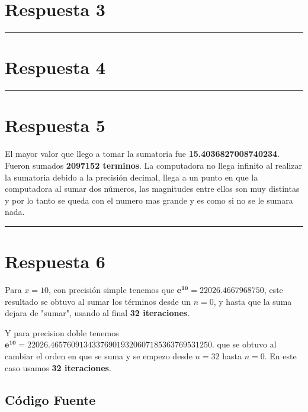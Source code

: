 \documentclass{article}
\begin{document}
\section*{Respuesta 3}



\hrule
\section*{Respuesta 4}



\hrule
\section*{Respuesta 5}
El mayor valor que llego a tomar la sumatoria fue \textbf{15.4036827008740234}.
Fueron sumados \textbf{2097152 terminos}. 
La computadora no llega infinito al realizar la sumatoria debido
a la precisión decimal, llega a un punto en que la computadora al sumar dos números, las magnitudes entre ellos
son muy distintas y por lo tanto se queda con el numero mas grande y es como si no se le sumara nada.


\hrule
\section*{Respuesta 6}
\begin{itemize}
	Para $x = 10$, con precisión simple tenemos que $\boldsymbol{e^{10} = 22026.4667968750}$,
	este resultado se obtuvo al sumar los términos desde un $n = 0$, y hasta que la suma dejara de "sumar",
	usando al final \textbf{32 iteraciones}.

	Y para precision doble tenemos $\boldsymbol{e^{10} = 22026.465760913433769019320607185363769531250}$.
	que se obtuvo al cambiar el orden en que se suma y se empezo desde $n = 32$ hasta $n = 0$. En este caso usamos \textbf{32 iteraciones}.

	

\end{itemize}




\newpage
\begin{centering}
	\section*{Código Fuente}
\end{centering}
\end{document}

